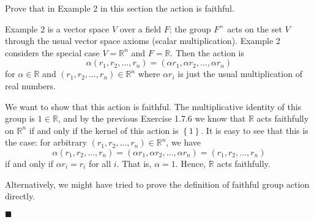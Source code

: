 \documentclass[12pt]{article}
\renewcommand{\qed}{\hfill$\blacksquare$}
\renewenvironment{proof}{\begin{addmargin}[1em]{0em}\begin{newproof}}{\end{newproof}\end{addmargin}\qed}
\newenvironment{problem}[2][Exercise]{\begin{trivlist}
\item[\hskip \labelsep {\bfseries #1}\hskip \labelsep {\bfseries #2.}]}{\end{trivlist}}
\begin{document}
\begin{problem}{1.7.7}
Prove that in Example 2 in this section the action is faithful.
\end{problem}
\begin{proof}
Example 2 is a vector space $V$ over a field $F$; the group $F^{\times}$ acts on the set $V$ through the usual vector space axioms (scalar multiplication). Example 2 considers the special case $V=\mathbb{R}^n$ and $F=\mathbb{R}$. Then the action is
$$ \alpha\left(r_1,r_2,\ldots,r_n\right) = \left(\alpha r_1, \alpha r_2,\ldots , \alpha r_n\right) $$ for $\alpha\in \mathbb{R}$ and $\left(r_1,r_2,\ldots,r_n\right)\in\mathbb{R}^n$ where $\alpha r_i$ is just the usual multiplication of real numbers.

We want to show that this action is faithful. The multiplicative identity of this group is $1\in\mathbb{R}$, and by the previous Exercise 1.7.6 we know that $\mathbb{R}$ acts faithfully on $\mathbb{R}^n$ if and only if the kernel of this action is $\left\{1\right\}$. It is easy to see that this is the case: for arbitrary $\left(r_1,r_2,\ldots,r_n\right)\in\mathbb{R}^n$, we have $$ \alpha \left(r_1,r_2,\ldots, r_n\right) = \left(\alpha r_1, \alpha r_2, \ldots, \alpha r_n\right) = \left(r_1,r_2,\ldots,r_n\right)$$ if and only if $\alpha r_i=r_i$ for all $i$. That is, $\alpha = 1$. Hence, $\mathbb{R}$ acts faithfully.

Alternatively, we might have tried to prove the definition of faithful group action directly.
\end{proof}
\end{document}
